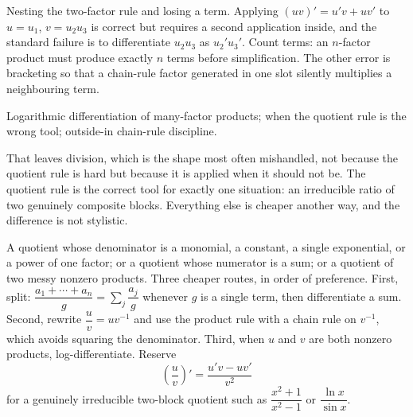 \begin{trap}
Nesting the two-factor rule and losing a term. Applying $(uv)'=u'v+uv'$ to $u=u_{1}$, $v=u_{2}u_{3}$ is correct but requires a second application inside, and the standard failure is to differentiate $u_{2}u_{3}$ as $u_{2}'u_{3}'$. Count terms: an $n$-factor product must produce exactly $n$ terms before simplification. The other error is bracketing so that a chain-rule factor generated in one slot silently multiplies a neighbouring term.
\end{trap}

\begin{seealsob}Logarithmic differentiation of many-factor products; when the quotient rule is the wrong tool; outside-in chain-rule discipline.\end{seealsob}

That leaves division, which is the shape most often mishandled, not because the quotient rule is hard but because it is applied when it should not be. The quotient rule is the correct tool for exactly one situation: an irreducible ratio of two genuinely composite blocks. Everything else is cheaper another way, and the difference is not stylistic.

\cue A quotient whose denominator is a monomial, a constant, a single exponential, or a power of one factor; or a quotient whose numerator is a sum; or a quotient of two messy nonzero products.
\method Three cheaper routes, in order of preference. First, split: $\dfrac{a_{1}+\cdots+a_{n}}{g}=\sum_{j}\dfrac{a_{j}}{g}$ whenever $g$ is a single term, then differentiate a sum. Second, rewrite $\dfrac uv=uv^{-1}$ and use the product rule with a chain rule on $v^{-1}$, which avoids squaring the denominator. Third, when $u$ and $v$ are both nonzero products, log-differentiate. Reserve
\[
\left(\frac uv\right)'=\frac{u'v-uv'}{v^{2}}
\]
for a genuinely irreducible two-block quotient such as $\dfrac{x^{2}+1}{x^{2}-1}$ or $\dfrac{\ln x}{\sin x}$.

